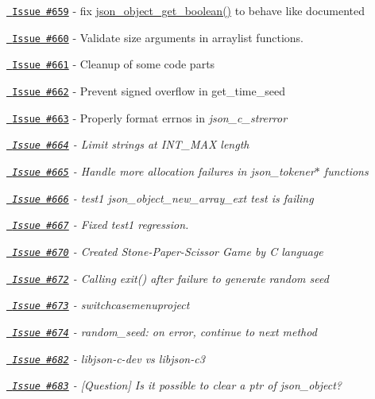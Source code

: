 \begin{DoxyItemize}
\item \href{https://github.com/json-c/json-c/issues/659}{\texttt{ Issue \#659}} -\/ fix \mbox{\hyperlink{json__object_8h_ac003fb99db7ecd674bb16d983d2f92ee}{json\+\_\+object\+\_\+get\+\_\+boolean()}} to behave like documented
\item \href{https://github.com/json-c/json-c/issues/660}{\texttt{ Issue \#660}} -\/ Validate size arguments in arraylist functions.
\item \href{https://github.com/json-c/json-c/issues/661}{\texttt{ Issue \#661}} -\/ Cleanup of some code parts
\item \href{https://github.com/json-c/json-c/issues/662}{\texttt{ Issue \#662}} -\/ Prevent signed overflow in get\+\_\+time\+\_\+seed
\item \href{https://github.com/json-c/json-c/issues/663}{\texttt{ Issue \#663}} -\/ Properly format errnos in {\itshape json\+\_\+c\+\_\+strerror}
\item {\itshape \href{https://github.com/json-c/json-c/issues/664}{\texttt{ Issue \#664}} -\/ Limit strings at INT\+\_\+\+MAX length}
\item {\itshape \href{https://github.com/json-c/json-c/issues/665}{\texttt{ Issue \#665}} -\/ Handle more allocation failures in json\+\_\+tokener$\ast$ functions}
\item {\itshape \href{https://github.com/json-c/json-c/issues/666}{\texttt{ Issue \#666}} -\/ test1 json\+\_\+object\+\_\+new\+\_\+array\+\_\+ext test is failing}
\item {\itshape \href{https://github.com/json-c/json-c/issues/667}{\texttt{ Issue \#667}} -\/ Fixed test1 regression.}
\item {\itshape \href{https://github.com/json-c/json-c/issues/670}{\texttt{ Issue \#670}} -\/ Created Stone-\/\+Paper-\/\+Scissor Game by C language}
\item {\itshape \href{https://github.com/json-c/json-c/issues/672}{\texttt{ Issue \#672}} -\/ Calling exit() after failure to generate random seed}
\item {\itshape \href{https://github.com/json-c/json-c/issues/673}{\texttt{ Issue \#673}} -\/ switchcasemenuproject}
\item {\itshape \href{https://github.com/json-c/json-c/issues/674}{\texttt{ Issue \#674}} -\/ random\+\_\+seed\+: on error, continue to next method}
\item {\itshape \href{https://github.com/json-c/json-c/issues/682}{\texttt{ Issue \#682}} -\/ libjson-\/c-\/dev vs libjson-\/c3}
\item {\itshape \href{https://github.com/json-c/json-c/issues/683}{\texttt{ Issue \#683}} -\/ \mbox{[}Question\mbox{]} Is it possible to clear a ptr of json\+\_\+object?}

\end{DoxyItemize}
